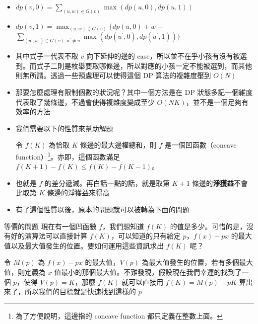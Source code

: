 \documentclass[standalone]{beamer}
\begin{document}
\begin{frame}{}
  \begin{itemize}
    \item $dp(v, 0) = \sum_{(u, w) \in G(v)}\max(dp(u, 0), dp(u, 1))$

    \item $dp(v, 1) = \max_{(u, w) \in G(v)} \{dp(u, 0) + w +$ $ 
      \sum_{(u^\prime, w^\prime) \in G(v), u^\prime \neq u}\max(dp(u^\prime, 0), dp(u^\prime, 1)) \}$

    \item 其中式子一代表不取 $v$ 向下延伸的邊的 case，所以並不在乎小孩有沒有被選到。而式子二則是枚舉要取哪條邊，所以對應的小孩一定不能被選到，而其他則無所謂。透過一些預處理可以使得這個 DP 算法的複雜度壓到 $O(N)$
    \item 那要怎麼處理有限制個數的狀況呢？其中一個方法是在 DP 狀態多記一個維度代表取了幾條邊，不過會使得複雜度變成至少 $O(NK)$，並不是一個足夠有效率的方法
  \end{itemize}
\end{frame}

\begin{frame}{}
  \begin{itemize}
    \item 我們需要以下的性質來幫助解題
    \begin{theorem}[性質]
      令 $f(K)$ 為恰取 $K$ 條邊的最大邊權總和，則 $f$ 是一個凹函數（concave function）\footnote{為了方便說明，這邊指的 concave function 都只定義在整數上面。}。亦即，這個函數滿足 $f(K + 1) - f(K) \leq f(K) - f(K - 1)$。
    \end{theorem}
    \item 也就是 $f$ 的差分遞減。再白話一點的話，就是取第 $K + 1$ 條邊的\textbf{淨獲益}不會比取第 $K$ 條邊的淨獲益來得高
    \item 有了這個性質以後，原本的問題就可以被轉為下面的問題
  \end{itemize}
\end{frame}

\begin{frame}{}
  \begin{problem}{等價的問題} 
    現在有一個凹函數 $f$，我們想知道 $f(K)$ 的值是多少。可惜的是，沒有好的演算法可以直接計算 $f(K)$，可以知道的只有給定 $p$，$f(x) - px$ 的最大值以及最大值發生的位置。要如何運用這些資訊求出 $f(K)$ 呢？
  \end{problem}

  令 $M(p)$ 為 $f(x) - px$ 的最大值，$V(p)$ 為最大值發生的位置，若有多個最大值，則定義為 $x$ 值最小的那個最大值。不難發現，假設現在我們幸運的找到了一個 $p$，使得 $V(p) = K$，那麼 $f(K)$ 就可以直接用 $f(K) = M(p) + pK$ 算出來了，所以我們的目標就是快速找到這樣的 $p$
\end{frame}
\end{document}
